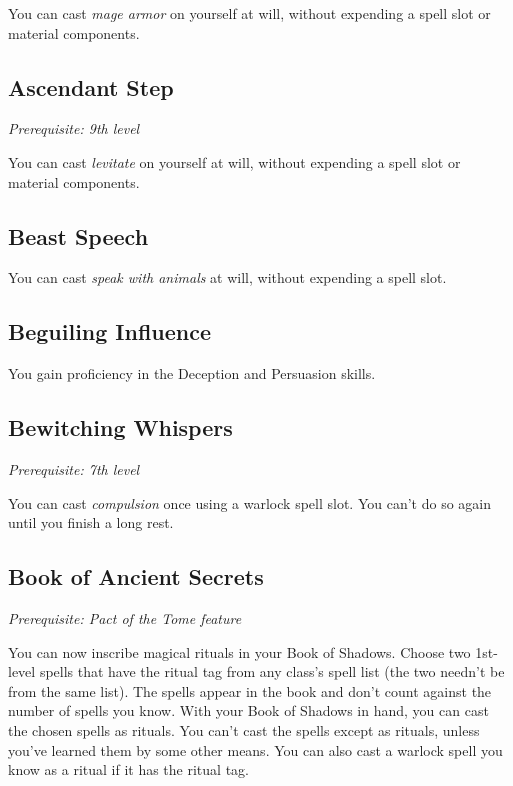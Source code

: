 You can cast \textit{mage armor} on yourself at will, without expending a spell slot or material components.

\subsection{Ascendant Step}

\textit{Prerequisite: 9th level}

You can cast \textit{levitate} on yourself at will, without expending a spell slot or material components.

\subsection{Beast Speech}

You can cast \textit{speak with animals} at will, without expending a spell slot.

\subsection{Beguiling Influence}

You gain proficiency in the Deception and Persuasion skills.

\subsection{Bewitching Whispers}

\textit{Prerequisite: 7th level}

You can cast \textit{compulsion} once using a warlock spell slot. You can't do so again until you finish a long rest.

\subsection{Book of Ancient Secrets}

\textit{Prerequisite: Pact of the Tome feature}

You can now inscribe magical rituals in your Book of Shadows. Choose two 1st-level spells that have the ritual tag from any class's spell list (the two needn't be from the same list). The spells appear in the book and don't count against the number of spells you know. With your Book of Shadows in hand, you can cast the chosen spells as rituals. You can't cast the spells except as rituals, unless you've learned them by some other means. You can also cast a warlock spell you know as a ritual if it has the ritual tag.

